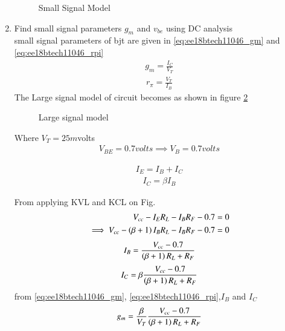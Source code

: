 \begin{enumerate}[label=\thesection.\arabic*.,ref=\thesection.\theenumi]
\begin{figure}[ht!]
	\begin{center}
		\resizebox{\columnwidth}{!}{}
	\end{center}
	\caption{Small Signal Model}
	\label{fig:ee18btech11046_smallSig}
\end{figure}
\renewcommand{\thefigure}{\theenumi}

%


\item Find small signal parameters 
 $g_{m}$ and $v_{be}$ using DC analysis
\\
%
\solution
small signal parameters of bjt are given in
\eqref{eq:ee18btech11046_gm} and \eqref{eq:ee18btech11046_rpi}
\begin{align}
g_{m} = \frac{I_{C}}{V_{T}}
\label{eq:ee18btech11046_gm}
\end{align}
\begin{align}
r_{\pi} = \frac{V_{T}}{I_{B}}
\label{eq:ee18btech11046_rpi}
\end{align}
The Large signal model of circuit becomes as shown in figure \ref{fig:ee18btech11046_largeSig}
\begin{figure}[ht!]
	\begin{center}
		\resizebox{\columnwidth}{!}{}
	\end{center}
	\caption{Large signal model}
	\label{fig:ee18btech11046_largeSig}
\end{figure}
\renewcommand{\thefigure}{\theenumi}


Where $V_{T} = 25m$volts
\begin{align}
V_{BE} = 0.7 volts 
\implies
V_{B} = 0.7 volts
\end{align}

\begin{align}
I_{E} = I_{B} + I_{C}
\end{align}
\begin{align}
I_{C} = \beta I_{B}
\end{align}

From applying KVL and KCL on Fig.
\begin{align}
V_{cc} - I_{E}R_{L} - I_{B}R_{F} - 0.7 = 0
\\
\implies
V_{cc} - \left(\beta+1\right)I_{B}R_{L} - I_{B}R_{F} - 0.7 = 0
\end{align}
\begin{align}
I_{B} = \frac{V_{cc}-0.7}{\left(\beta+1\right)R_{L}+R_{F}}
\label{eq:ee18btech11046_IB}
\end{align}
\begin{align}
I_{C} = \beta \frac{V_{cc}-0.7}{\left(\beta+1\right)R_{L}+R_{F}}
\label{eq:ee18btech11046_IC}
\end{align}
from \eqref{eq:ee18btech11046_gm}, \eqref{eq:ee18btech11046_rpi},$I_{B}$ and $I_{C}$
\begin{align}
g_{m} = \frac{\beta}{V_{T}}\frac{V_{cc}-0.7}{\left(\beta+1\right)R_{L}+R_{F}}
\label{eq:ee18btech11046_gmval}
\end{align}


\end{enumerate}
